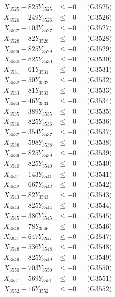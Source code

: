 \documentclass[a4paper,10pt]{article}
\begin{document}
{\begin{align}
X_{3525} - 825Y_{3525} &\leq +0 && \text{(G3525)} \\
X_{3526} - 249Y_{3526} &\leq +0 && \text{(G3526)} \\
X_{3527} - 103Y_{3527} &\leq +0 && \text{(G3527)} \\
X_{3528} - 82Y_{3528} &\leq +0 && \text{(G3528)} \\
X_{3529} - 825Y_{3529} &\leq +0 && \text{(G3529)} \\
X_{3530} - 825Y_{3530} &\leq +0 && \text{(G3530)} \\
\allowbreak
X_{3531} - 61Y_{3531} &\leq +0 && \text{(G3531)} \\
X_{3532} - 50Y_{3532} &\leq +0 && \text{(G3532)} \\
X_{3533} - 81Y_{3533} &\leq +0 && \text{(G3533)} \\
X_{3534} - 46Y_{3534} &\leq +0 && \text{(G3534)} \\
X_{3535} - 389Y_{3535} &\leq +0 && \text{(G3535)} \\
X_{3536} - 825Y_{3536} &\leq +0 && \text{(G3536)} \\
X_{3537} - 354Y_{3537} &\leq +0 && \text{(G3537)} \\
X_{3538} - 598Y_{3538} &\leq +0 && \text{(G3538)} \\
X_{3539} - 825Y_{3539} &\leq +0 && \text{(G3539)} \\
X_{3540} - 825Y_{3540} &\leq +0 && \text{(G3540)} \\
\allowbreak
X_{3541} - 143Y_{3541} &\leq +0 && \text{(G3541)} \\
X_{3542} - 667Y_{3542} &\leq +0 && \text{(G3542)} \\
X_{3543} - 82Y_{3543} &\leq +0 && \text{(G3543)} \\
X_{3544} - 825Y_{3544} &\leq +0 && \text{(G3544)} \\
X_{3545} - 380Y_{3545} &\leq +0 && \text{(G3545)} \\
X_{3546} - 78Y_{3546} &\leq +0 && \text{(G3546)} \\
X_{3547} - 647Y_{3547} &\leq +0 && \text{(G3547)} \\
X_{3548} - 536Y_{3548} &\leq +0 && \text{(G3548)} \\
X_{3549} - 825Y_{3549} &\leq +0 && \text{(G3549)} \\
X_{3550} - 703Y_{3550} &\leq +0 && \text{(G3550)} \\
\allowbreak
X_{3551} - 569Y_{3551} &\leq +0 && \text{(G3551)} \\
X_{3552} - 16Y_{3552} &\leq +0 && \text{(G3552)} \\

\end{align}}
\end{document}
